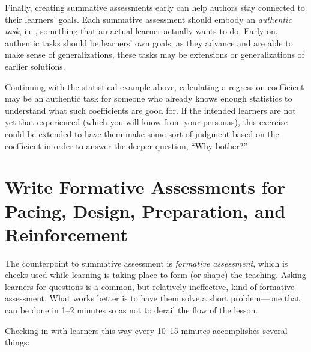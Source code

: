 \documentclass[10pt,letterpaper]{article}
\newcommand{\rulemajor}[1]{\section{#1}}
\begin{document}
Finally, creating summative assessments early can help authors stay connected to
their learners' goals.  Each summative assessment should embody an
\emph{authentic task}, i.e., something that an actual learner actually wants to
do.  Early on, authentic tasks should be learners' own goals; as they advance
and are able to make sense of generalizations, these tasks may be extensions or
generalizations of earlier solutions.

Continuing with the statistical example above, calculating a regression
coefficient may be an authentic task for someone who already knows enough
statistics to understand what such coefficients are good for.  If the intended
learners are not yet that experienced (which you will know from your personas),
this exercise could be extended to have them make some sort of judgment based
on the coefficient in order to answer the deeper question, ``Why bother?''

\rulemajor{Write Formative Assessments for Pacing, Design, Preparation, and Reinforcement}

The counterpoint to summative assessment is \emph{formative assessment}, which is
checks used while learning is taking place to form (or shape) the teaching.
Asking learners for questions is a common, but relatively ineffective, kind of
formative assessment.  What works better is to have them solve a short
problem---one that can be done in 1--2 minutes so as not to derail the flow of
the lesson.

Checking in with learners this way every 10--15 minutes accomplishes several
things:
\end{document}
